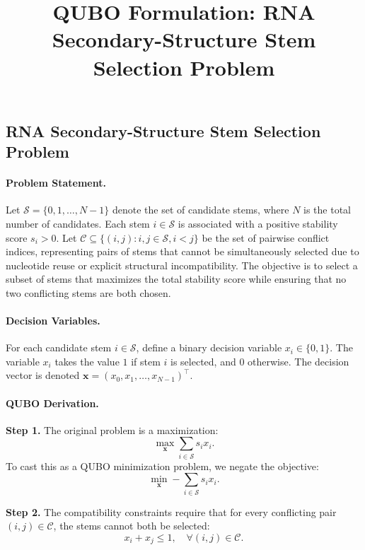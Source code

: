 \documentclass[12pt]{article}
\title{QUBO Formulation: RNA Secondary-Structure Stem Selection Problem}
\date{}
\begin{document}
\maketitle

\subsection*{RNA Secondary-Structure Stem Selection Problem}

\paragraph{Problem Statement.}
Let $\mathcal{S} = \{0, 1, \dots, N-1\}$ denote the set of candidate stems, where $N$ is the total number of candidates. Each stem $i \in \mathcal{S}$ is associated with a positive stability score $s_i > 0$. Let $\mathcal{C} \subseteq \{(i,j) : i,j \in \mathcal{S}, i < j\}$ be the set of pairwise conflict indices, representing pairs of stems that cannot be simultaneously selected due to nucleotide reuse or explicit structural incompatibility. The objective is to select a subset of stems that maximizes the total stability score while ensuring that no two conflicting stems are both chosen.

\paragraph{Decision Variables.}
For each candidate stem $i \in \mathcal{S}$, define a binary decision variable $x_i \in \{0,1\}$. The variable $x_i$ takes the value $1$ if stem $i$ is selected, and $0$ otherwise. The decision vector is denoted $\mathbf{x} = (x_0, x_1, \dots, x_{N-1})^\top$.

\paragraph{QUBO Derivation.}
\textbf{Step 1.} The original problem is a maximization:
\begin{equation}
  \max_{\mathbf{x}} \sum_{i \in \mathcal{S}} s_i x_i.
\end{equation}
To cast this as a QUBO minimization problem, we negate the objective:
\begin{equation}
  \min_{\mathbf{x}} -\sum_{i \in \mathcal{S}} s_i x_i.
\end{equation}

\textbf{Step 2.} The compatibility constraints require that for every conflicting pair $(i,j) \in \mathcal{C}$, the stems cannot both be selected:
\begin{equation}
  x_i + x_j \le 1, \quad \forall (i,j) \in \mathcal{C}.
\end{equation}
\end{document}
